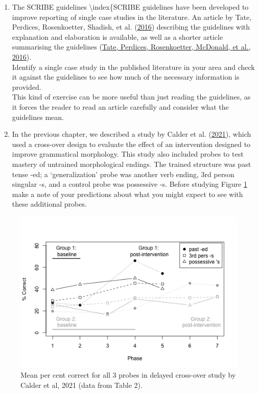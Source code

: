 \documentclass{krantz}
\begin{document}
\begin{enumerate}
\def\labelenumi{\arabic{enumi}.}
\setcounter{enumi}{1}
\item
  The SCRIBE guidelines  \textbackslash index\{SCRIBE guidelines  have been developed to improve reporting of single case studies in the literature. An article by Tate, Perdices, Rosenkoetter, Shadish, et al. (\protect\hyperlink{ref-tate2016}{2016}) describing the guidelines with explanation and elaboration is available, as well as a shorter article summarising the guidelines (\protect\hyperlink{ref-tate2016a}{Tate, Perdices, Rosenkoetter, McDonald, et al., 2016}).\\
  Identify a single case study in the published literature in your area and check it against the guidelines to see how much of the necessary information is provided.\\
  This kind of exercise can be more useful than just reading the guidelines, as it forces the reader to read an article carefully and consider what the guidelines mean.
\item
  In the previous chapter, we described a study by Calder et al. (\protect\hyperlink{ref-calder2021}{2021}), which used a cross-over design to evaluate the effect of an intervention designed to improve grammatical morphology. This study also included probes to test mastery of untrained morphological endings. The trained structure was past tense -ed; a `generalization' probe was another verb ending, 3rd person singular -s, and a control probe was possessive -s. Before studying Figure \ref{fig:Calderplus} make a note of your predictions about what you might expect to see with these additional probes.
\end{enumerate}

\begin{figure}
\includegraphics[width=0.85\linewidth]{images_bw/calderfig-2} \caption{Mean per cent correct for all 3 probes in delayed cross-over study by Calder et al, 2021 (data from Table 2).}\label{fig:Calderplus}
\end{figure}
\end{document}
